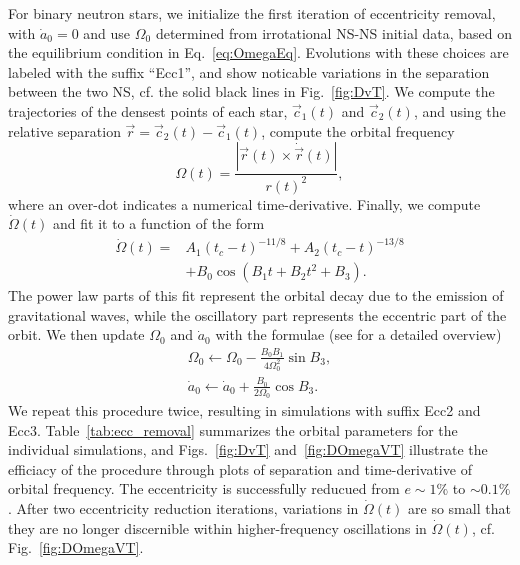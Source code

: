 \documentclass[aps,prd,amsmath,floatfix
,twocolumn
,superscriptaddress,nofootinbib,showpacs]{revtex4-1}
\theoremstyle{plain} \newtheorem{thm}{Theorem} \newtheorem{lem}{Lemma}
\newcommand{\harald}[1]{{\textcolor{OliveGreen}{#1}}} %
\begin{document}
\harald{For binary neutron stars, we} initialize the first iteration of
  eccentricity removal, \harald{with} $\dot{a}_0=0$ and use $\Omega_0$
  determined from irrotational NS-NS initial data, based on the equilibrium condition in Eq.~\ref{eq:OmegaEq}.  Evolutions
  with these choices are labeled with the suffix ``Ecc1'', and show
  noticable variations in the separation between the two NS, cf. the
  solid black lines in Fig.~\ref{fig:DvT}.
We
compute the trajectories of the densest points of each star,
$\vec c_1(t)$ and $\vec c_2(t)$, and using the relative separation
$\vec r=\vec c_2(t) - \vec c_1(t)$, compute the orbital frequency
\begin{equation}
\label{eq:Omega}
\Omega(t) = \frac{|\vec r(t)\times\dot{\vec{r}}(t)|}{r(t)^2},
\end{equation}
where an over-dot indicates a numerical time-derivative.
Finally, we compute $\dot{\Omega}(t)$ and fit it to a function of the form
\begin{align}
\dot{\Omega}(t) = & A_1(t_c-t)^{-11/8} + A_2(t_c-t)^{-13/8}\nonumber \\
&+ B_0\cos{(B_1t
  + B_2t^2 + B_3)}.
\end{align}
The power law parts of this fit represent the orbital decay due to the
emission of gravitational waves, while the oscillatory part represents
the eccentric part of the orbit. We then update $\Omega_0$ and $\dot{a}_0$ 
with the formulae (see
\cite{Buonanno:2010yk} for a detailed overview)
\begin{align}
  \Omega_0 \leftarrow \Omega_0 - \frac{B_0B_1}{4\Omega_0^2}\sin B_3, \\
  \dot{a}_0\leftarrow \dot{a}_0 +\frac{B_0}{2\Omega_0}\cos B_3.
\end{align}
We repeat this procedure twice, resulting in simulations with suffix
Ecc2 and Ecc3.  Table~\ref{tab:ecc_removal} summarizes the orbital
parameters for the individual simulations, and Figs.~\ref{fig:DvT}
and~\ref{fig:DOmegaVT} illustrate the efficiacy of the procedure
through plots of separation and time-derivative of orbital frequency.
The eccentricity is successfully reducued from $e\sim 1\%$ to
$\sim 0.1\%$.  After two eccentricity reduction iterations, variations
in $\dot\Omega(t)$ are so small that they are no longer discernible
within higher-frequency oscillations in $\dot\Omega(t)$,
cf. Fig.~\ref{fig:DOmegaVT}.
\end{document}
